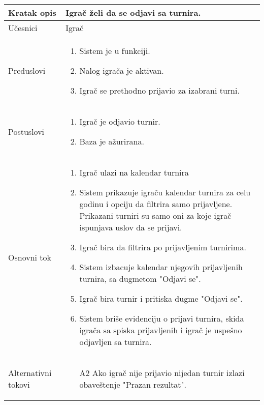 \documentclass{article}
\begin{document}
        \begin{longtable}{| p{} | p{} |} 
            \hline
                Kratak opis & Igrač želi da se odjavi sa turnira.\\ 
            \hline    
                Učesnici & Igrač \\
            \hline
               Preduslovi & \begin{enumerate}
                   \item Sistem je u funkciji.
                   \item Nalog igrača je aktivan.
                   \item Igrač se prethodno prijavio za izabrani turni.
               \end{enumerate}\\
            \hline  
                Postuslovi & \begin{enumerate}
                    \item Igrač je odjavio turnir.
                    \item Baza je ažurirana.
                \end{enumerate}\\
            \hline
                Osnovni tok & \begin{enumerate}
                    \item Igrač ulazi na kalendar turnira
                    \item Sistem prikazuje igraču kalendar turnira za celu godinu i opciju da filtrira samo prijavljene. Prikazani turniri su samo oni za koje igrač ispunjava uslov da se prijavi.
                    \item Igrač bira da filtrira po prijavljenim turnirima.
                    \item Sistem izbacuje kalendar njegovih prijavljenih turnira, sa dugmetom "Odjavi se".
                    \item Igrač bira turnir i pritiska dugme "Odjavi se".        
                    \item Sistem briše evidenciju o prijavi turnira, skida igrača sa spiska prijavljenih i igrač je uspešno odjavljen sa turnira.
                \end{enumerate}\\
            \hline
                Alternativni tokovi & 
                \begin{itemize}
                    \item[A2] Ako igrač nije prijavio nijedan turnir izlazi obaveštenje "Prazan rezultat".

\end{itemize}
\end{longtable}
\end{document}
